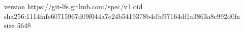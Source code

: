 version https://git-lfs.github.com/spec/v1
oid sha256:1114fafe60715967d09f044a7e24b5419378b4dbf97164df1a3863a8c992d0fa
size 5648
